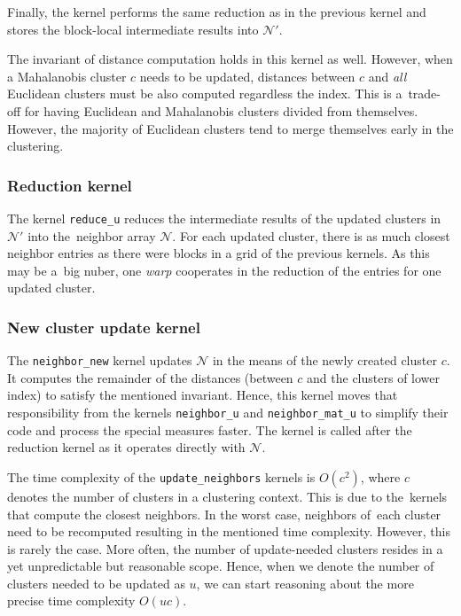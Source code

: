 Finally, the kernel performs the same reduction as in the previous kernel and stores the block-local intermediate results into $\mathcal{N}'$.

\begin{rem}
	The invariant of distance computation holds in this kernel as well. However, when a Mahalanobis cluster $c$ needs to be updated, distances between $c$ and \emph{all} Euclidean clusters must be also computed regardless the index. This is a~trade-off for having Euclidean and Mahalanobis clusters divided from themselves. However, the majority of Euclidean clusters tend to merge themselves early in the clustering.
\end{rem}

\subsubsection{Reduction kernel} The kernel \texttt{reduce\_u} reduces the intermediate results of the updated clusters in~$\mathcal{N}'$ into the~neighbor array $\mathcal{N}$. For each updated cluster, there is as much closest neighbor entries as there were blocks in a grid of the previous kernels. As this may be a~big nuber, one \emph{warp} cooperates in the reduction of the entries for one updated cluster.

\subsubsection{New cluster update kernel} The \texttt{neighbor\_new} kernel updates $\mathcal{N}$ in the means of the newly created cluster $c$. It computes the remainder of the distances (between $c$ and the clusters of lower index) to satisfy the mentioned invariant. Hence, this kernel moves that responsibility from the kernels \texttt{neighbor\_u} and \texttt{neighbor\_mat\_u} to simplify their code and process the special measures faster. The kernel is called after the reduction kernel as it operates directly with $\mathcal{N}$. 

\begin{rem}
	The time complexity of the \texttt{update\_neighbors} kernels is $O(c^2)$, where $c$ denotes the number of clusters in a clustering context. This is due to the~kernels that compute the closest neighbors. In the worst case, neighbors of~each cluster need to be recomputed resulting in the mentioned time complexity. However, this is rarely the case. More often, the number of update-needed clusters resides in a yet unpredictable but reasonable scope. Hence, when we denote the number of clusters needed to be updated as $u$, we can start reasoning about the more precise time complexity $O(uc)$.
\end{rem}
